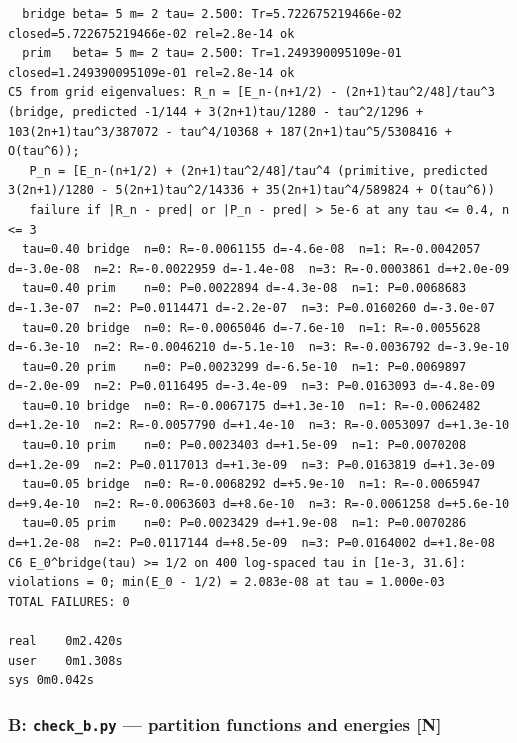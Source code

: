 \documentclass[11pt,a4paper]{article}
\begin{document}
\begin{lstlisting}
  bridge beta= 5 m= 2 tau= 2.500: Tr=5.722675219466e-02 closed=5.722675219466e-02 rel=2.8e-14 ok
  prim   beta= 5 m= 2 tau= 2.500: Tr=1.249390095109e-01 closed=1.249390095109e-01 rel=2.8e-14 ok
C5 from grid eigenvalues: R_n = [E_n-(n+1/2) - (2n+1)tau^2/48]/tau^3 (bridge, predicted -1/144 + 3(2n+1)tau/1280 - tau^2/1296 + 103(2n+1)tau^3/387072 - tau^4/10368 + 187(2n+1)tau^5/5308416 + O(tau^6));
   P_n = [E_n-(n+1/2) + (2n+1)tau^2/48]/tau^4 (primitive, predicted 3(2n+1)/1280 - 5(2n+1)tau^2/14336 + 35(2n+1)tau^4/589824 + O(tau^6))
   failure if |R_n - pred| or |P_n - pred| > 5e-6 at any tau <= 0.4, n <= 3
  tau=0.40 bridge  n=0: R=-0.0061155 d=-4.6e-08  n=1: R=-0.0042057 d=-3.0e-08  n=2: R=-0.0022959 d=-1.4e-08  n=3: R=-0.0003861 d=+2.0e-09
  tau=0.40 prim    n=0: P=0.0022894 d=-4.3e-08  n=1: P=0.0068683 d=-1.3e-07  n=2: P=0.0114471 d=-2.2e-07  n=3: P=0.0160260 d=-3.0e-07
  tau=0.20 bridge  n=0: R=-0.0065046 d=-7.6e-10  n=1: R=-0.0055628 d=-6.3e-10  n=2: R=-0.0046210 d=-5.1e-10  n=3: R=-0.0036792 d=-3.9e-10
  tau=0.20 prim    n=0: P=0.0023299 d=-6.5e-10  n=1: P=0.0069897 d=-2.0e-09  n=2: P=0.0116495 d=-3.4e-09  n=3: P=0.0163093 d=-4.8e-09
  tau=0.10 bridge  n=0: R=-0.0067175 d=+1.3e-10  n=1: R=-0.0062482 d=+1.2e-10  n=2: R=-0.0057790 d=+1.4e-10  n=3: R=-0.0053097 d=+1.3e-10
  tau=0.10 prim    n=0: P=0.0023403 d=+1.5e-09  n=1: P=0.0070208 d=+1.2e-09  n=2: P=0.0117013 d=+1.3e-09  n=3: P=0.0163819 d=+1.3e-09
  tau=0.05 bridge  n=0: R=-0.0068292 d=+5.9e-10  n=1: R=-0.0065947 d=+9.4e-10  n=2: R=-0.0063603 d=+8.6e-10  n=3: R=-0.0061258 d=+5.6e-10
  tau=0.05 prim    n=0: P=0.0023429 d=+1.9e-08  n=1: P=0.0070286 d=+1.2e-08  n=2: P=0.0117144 d=+8.5e-09  n=3: P=0.0164002 d=+1.8e-08
C6 E_0^bridge(tau) >= 1/2 on 400 log-spaced tau in [1e-3, 31.6]: violations = 0; min(E_0 - 1/2) = 2.083e-08 at tau = 1.000e-03
TOTAL FAILURES: 0

real    0m2.420s
user    0m1.308s
sys 0m0.042s
\end{lstlisting}

\hypertarget{b-check_b.py-partition-functions-and-energies-n}{%
\subsubsection{\texorpdfstring{B: \texttt{check\_b.py} --- partition
functions and energies
{[}N{]}}{B: check\_b.py --- partition functions and energies {[}N{]}}}\label{b-check_b.py-partition-functions-and-energies-n}}
\end{document}
